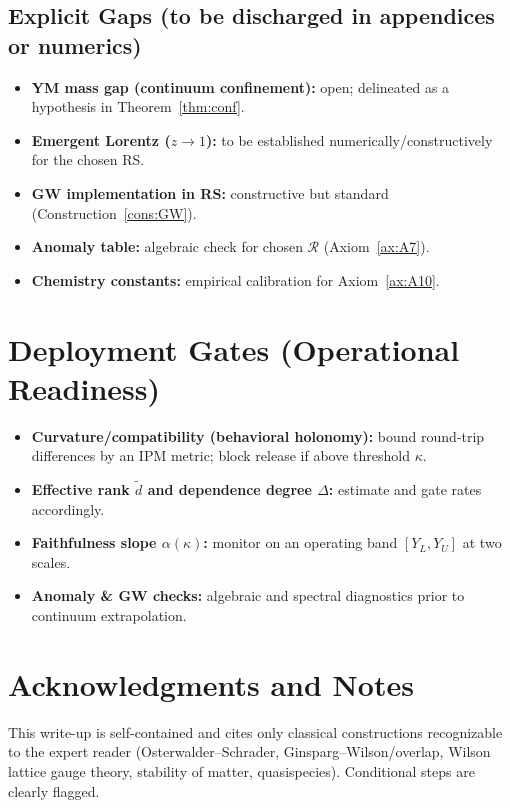 \documentclass[11pt]{article}
\theoremstyle{plain}
\theoremstyle{definition}
\theoremstyle{remark}
\begin{document}
\subsection*{Explicit Gaps (to be discharged in appendices or numerics)}
\begin{itemize}[leftmargin=2.25em]
\item \textbf{YM mass gap (continuum confinement):} open; delineated as a hypothesis in Theorem~\ref{thm:conf}.
\item \textbf{Emergent Lorentz ($z\to 1$):} to be established numerically/constructively for the chosen \textsf{RS}.
\item \textbf{GW implementation in \textsf{RS}:} constructive but standard (Construction~\ref{cons:GW}).
\item \textbf{Anomaly table:} algebraic check for chosen $\mathcal{R}$ (Axiom~\ref{ax:A7}).
\item \textbf{Chemistry constants:} empirical calibration for Axiom~\ref{ax:A10}.
\end{itemize}

\section{Deployment Gates (Operational Readiness)}
\begin{itemize}[leftmargin=2.25em]
\item \textbf{Curvature/compatibility (behavioral holonomy):} bound round-trip differences by an IPM metric; block release if above threshold $\kappa$.
\item \textbf{Effective rank $\tilde d$ and dependence degree $\Delta$:} estimate and gate rates accordingly.
\item \textbf{Faithfulness slope $\alpha(\kappa)$:} monitor on an operating band $[Y_L,Y_U]$ at two scales.
\item \textbf{Anomaly \& GW checks:} algebraic and spectral diagnostics prior to continuum extrapolation.
\end{itemize}

\section*{Acknowledgments and Notes}
This write-up is self-contained and cites only classical constructions recognizable to the expert reader (Osterwalder--Schrader, Ginsparg--Wilson/overlap, Wilson lattice gauge theory, stability of matter, quasispecies). Conditional steps are clearly flagged.
\end{document}
